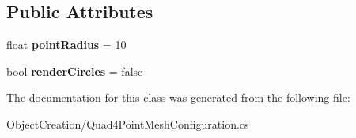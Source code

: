 \subsection*{Public Attributes}
\begin{DoxyCompactItemize}
\item 
\mbox{\label{class_object_creation_1_1_quad4_point_mesh_configuration_ac73682bf5cf39ce2d854d5463b9ae112}} 
float {\bfseries point\+Radius} = 10
\item 
\mbox{\label{class_object_creation_1_1_quad4_point_mesh_configuration_abb11b39a3a00e3060e2b48f19beb0d3c}} 
bool {\bfseries render\+Circles} = false
\end{DoxyCompactItemize}


The documentation for this class was generated from the following file\+:\begin{DoxyCompactItemize}
\item 
Object\+Creation/Quad4\+Point\+Mesh\+Configuration.\+cs\end{DoxyCompactItemize}
